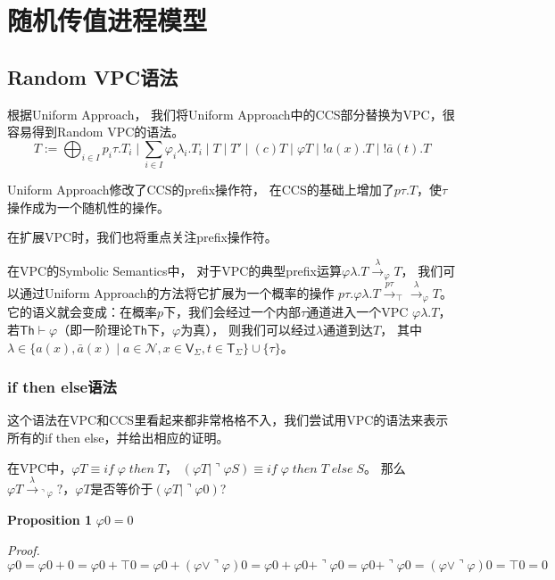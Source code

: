 
\chapter{随机传值进程模型}

\section{Random VPC语法}
根据Uniform Approach， 我们将Uniform Approach中的CCS部分替换为VPC，很容易得到Random VPC的语法。
$$T:=\bigoplus_{i\in I}p_i \tau.T_i\mid \sum_{i\in I} \varphi_i\lambda_i.T_i\mid T \mid T'\mid (c)T\mid \varphi T\mid !a(x).T \mid !\bar{a}(t).T$$

Uniform Approach修改了CCS的prefix操作符，
在CCS的基础上增加了$p\tau.T$，使$\tau$操作成为一个随机性的操作。

在扩展VPC时，我们也将重点关注prefix操作符。

在VPC的Symbolic Semantics中，
对于VPC的典型prefix运算$\varphi \lambda. T\stackrel{\lambda}{\rightarrow}_{\varphi} T$，
我们可以通过Uniform Approach的方法将它扩展为一个概率的操作
$p\tau.\varphi \lambda. T\stackrel{p\tau}{\rightarrow}_{\top}\stackrel{\lambda}{\rightarrow}_{\varphi} T$。
它的语义就会变成：在概率$p$下，我们会经过一个内部$\tau$通道进入一个VPC $\varphi\lambda.T$，
若$\mathsf{Th}\vdash \varphi$（即一阶理论$\mathsf{Th}$下，$\varphi$为真），
则我们可以经过$\lambda$通道到达$T$， 其中$\lambda \in \{a(x),\bar{a}(x)\mid a\in \mathcal{N}, x\in \mathsf{V}_\Sigma, t\in \mathsf{T}_\Sigma\}\cup \{\tau\}$。

\subsection{if then else语法}

这个语法在VPC和CCS里看起来都非常格格不入，我们尝试用VPC的语法来表示所有的if then else，并给出相应的证明。

在VPC中，$\varphi T \equiv if\; \varphi \; then \; T$， $(\varphi T\mid \urcorner \varphi S)\equiv if \; \varphi \; then\; T \; else \; S$。
那么$\varphi T \stackrel{\lambda}{\rightarrow}_{\urcorner \varphi} ?$，$\varphi T$是否等价于$(\varphi T\mid \urcorner \varphi 0)$?

\textbf{Proposition 1} $\varphi 0 = 0$

\textit{Proof.} $\varphi 0 = \varphi 0 + 0 = \varphi 0 + \top 0 = \varphi 0 + (\varphi \vee \urcorner \varphi)0 = \varphi 0 + \varphi 0 + \urcorner \varphi 0 = \varphi 0 + \urcorner \varphi 0 = (\varphi \vee \urcorner \varphi)0 = \top 0 = 0$

